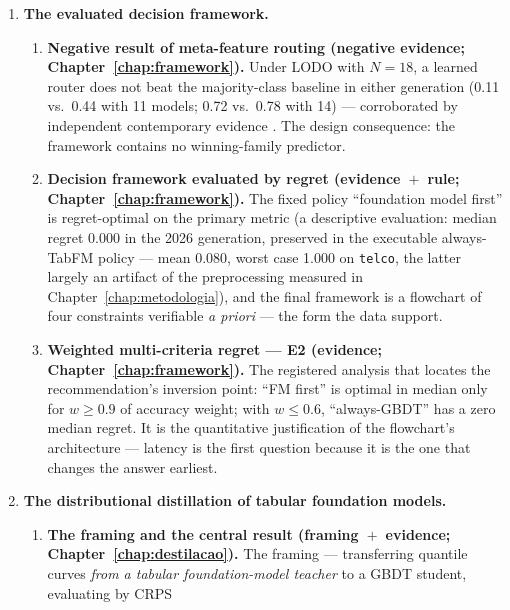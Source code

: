 \begin{enumerate}
\begin{enumerate}
    without GBDT baselines and under short training, which the
    uniform protocol does not reproduce; the recorded counterpart is
    that both are cheap to serve (2.3--3.1~\us/row) --- the problem
    is performance, not cost.
  \end{enumerate}
  \item \textbf{The evaluated decision framework.}
  \begin{enumerate}
  \item \textbf{Negative result of meta-feature routing (negative
    evidence; Chapter~\ref{chap:framework}).} Under LODO with
    $N{=}18$, a learned router does not beat the majority-class
    baseline in either generation (0.11 vs.\ 0.44 with 11 models;
    0.72 vs.\ 0.78 with 14) --- corroborated by independent
    contemporary evidence \citep{herre2026}. The design consequence:
    the framework contains no winning-family predictor.
  \item \textbf{Decision framework evaluated by regret
    (evidence~$+$~rule; Chapter~\ref{chap:framework}).} The fixed
    policy ``foundation model first'' is regret-optimal on the
    primary metric (a descriptive evaluation: median regret 0.000 in
    the 2026 generation,
    preserved in the executable always-TabFM policy --- mean 0.080,
    worst case 1.000 on \texttt{telco}, the latter largely an
    artifact of the preprocessing measured in
    Chapter~\ref{chap:metodologia}), and the final framework is a
    flowchart of four constraints verifiable \emph{a priori} ---
    the form the data support.
  \item \textbf{Weighted multi-criteria regret --- E2 (evidence;
    Chapter~\ref{chap:framework}).} The registered analysis that
    locates the recommendation's inversion point: ``FM first'' is
    optimal in median only for $w \geq 0.9$ of accuracy weight;
    with $w \leq 0.6$, ``always-GBDT'' has a zero median regret. It
    is the quantitative justification of the flowchart's
    architecture --- latency is the first question because it is
    the one that changes the answer earliest.
  \end{enumerate}
  \item \textbf{The distributional distillation of tabular
    foundation models.}
  \begin{enumerate}
  \item \textbf{The framing and the central result
    (framing~$+$~evidence; Chapter~\ref{chap:destilacao}).} The
    framing --- transferring quantile curves \emph{from a tabular
    foundation-model teacher} to a GBDT student, evaluating by CRPS

\end{enumerate}
\end{enumerate}
